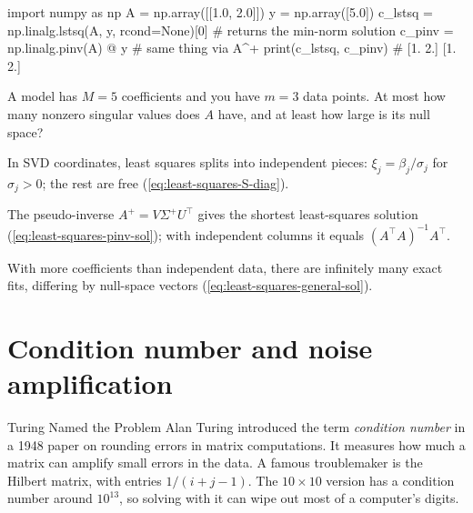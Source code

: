 \begin{pycode}
import numpy as np
A = np.array([[1.0, 2.0]])
y = np.array([5.0])
c_lstsq = np.linalg.lstsq(A, y, rcond=None)[0]  # returns the min-norm solution
c_pinv  = np.linalg.pinv(A) @ y                  # same thing via A^+
print(c_lstsq, c_pinv)                           # [1. 2.] [1. 2.]
\end{pycode}

\begin{checkpoint}
A model has $M=5$ coefficients and you have $m=3$ data points. At most how many nonzero singular values does $A$ have, and at least how large is its null space?
\end{checkpoint}

\begin{keyideas}
\item In SVD coordinates, least squares splits into independent pieces: $\xi_j = \beta_j/\sigma_j$ for $\sigma_j>0$; the rest are free (\cref{eq:least-squares-S-diag}).
\item The pseudo-inverse $A^+ = V\Sigma^+U^\top$ gives the shortest least-squares solution (\cref{eq:least-squares-pinv-sol}); with independent columns it equals $(A^\top A)^{-1}A^\top$.
\item With more coefficients than independent data, there are infinitely many exact fits, differing by null-space vectors (\cref{eq:least-squares-general-sol}).
\end{keyideas}

\section{Condition number and noise amplification}\label{sec:least-squares-cond}
\begin{didyouknow}{Turing Named the Problem}
Alan Turing introduced the term \emph{condition number} in a 1948 paper on rounding errors in matrix computations. It measures how much a matrix can amplify small errors in the data. A famous troublemaker is the Hilbert matrix, with entries $1/(i+j-1)$. The $10\times10$ version has a condition number around $10^{13}$, so solving with it can wipe out most of a computer's digits.
\end{didyouknow}

